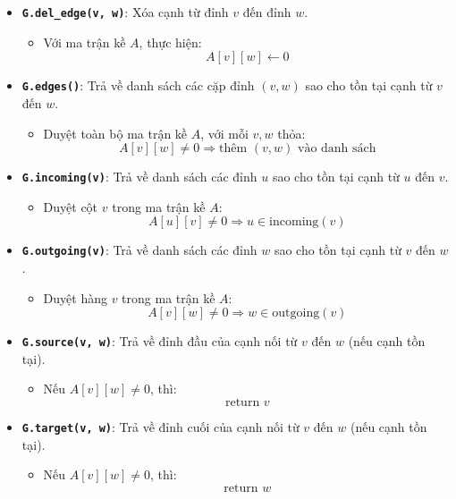 \documentclass{article}
\begin{document}
	\begin{itemize}
		\item \textbf{\texttt{G.del\_edge(v, w)}}: Xóa cạnh từ đỉnh $v$ đến đỉnh $w$.
		
		\begin{itemize}
			\item Với ma trận kề $A$, thực hiện: 
			\[
			A[v][w] \gets 0
			\]
		\end{itemize}
		
		\item \textbf{\texttt{G.edges()}}: Trả về danh sách các cặp đỉnh $(v, w)$ sao cho tồn tại cạnh từ $v$ đến $w$.
		
		\begin{itemize}
			\item Duyệt toàn bộ ma trận kề $A$, với mỗi $v,w$ thỏa:
			\[
			A[v][w] \ne 0 \Rightarrow \text{thêm } (v, w) \text{ vào danh sách}
			\]
		\end{itemize}
		
		\item \textbf{\texttt{G.incoming(v)}}: Trả về danh sách các đỉnh $u$ sao cho tồn tại cạnh từ $u$ đến $v$.
		
		\begin{itemize}
			\item Duyệt cột $v$ trong ma trận kề $A$:
			\[
			A[u][v] \ne 0 \Rightarrow u \in \text{incoming}(v)
			\]
		\end{itemize}
		
		\item \textbf{\texttt{G.outgoing(v)}}: Trả về danh sách các đỉnh $w$ sao cho tồn tại cạnh từ $v$ đến $w$.
		
		\begin{itemize}
			\item Duyệt hàng $v$ trong ma trận kề $A$:
			\[
			A[v][w] \ne 0 \Rightarrow w \in \text{outgoing}(v)
			\]
		\end{itemize}
		
		\item \textbf{\texttt{G.source(v, w)}}: Trả về đỉnh đầu của cạnh nối từ $v$ đến $w$ (nếu cạnh tồn tại).
		
		\begin{itemize}
			\item Nếu $A[v][w] \ne 0$, thì:
			\[
			\text{return } v
			\]
		\end{itemize}
		
		\item \textbf{\texttt{G.target(v, w)}}: Trả về đỉnh cuối của cạnh nối từ $v$ đến $w$ (nếu cạnh tồn tại).
		
		\begin{itemize}
			\item Nếu $A[v][w] \ne 0$, thì:
			\[
			\text{return } w
			\]
		\end{itemize}
		
	\end{itemize}
	
\end{document}
